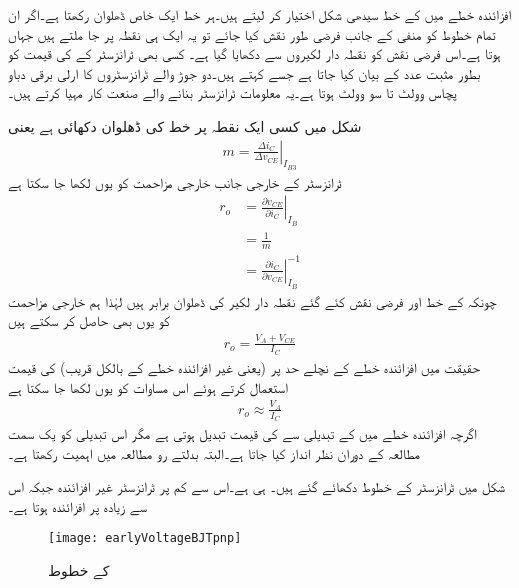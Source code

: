 افزائندہ خطے میں  کے خط سیدھی شکل اختیار کر لیتے ہیں۔ہر خط ایک خاص ڈھلوان رکھتا ہے۔اگر ان تمام خطوط کو منفی  کے جانب فرضی طور نقش کیا جائے تو یہ ایک ہی نقطہ پر جا ملتے ہیں جہاں  ہوتا ہے۔اس فرضی نقش کو نقطہ دار لکیروں سے دکھایا گیا ہے۔ کسی بھی ٹرانزسٹر کے  کی قیمت کو بطور مثبت عدد کے بیان کیا جاتا ہے جسے   کہتے ہیں۔دو جوڑ والے ٹرانزسٹروں کا ارلی برقی دباو پچاس وولٹ تا سو وولٹ ہوتا ہے۔یہ معلومات ٹرانزسٹر بنانے والے صنعت کار مہیا کرتے ہیں۔	

شکل   میں کسی ایک نقطہ پر خط کی ڈھلوان  دکھائی ہے یعنی
\begin{align*}
m=\left . \frac{\Delta i_C}{\Delta v_{CE}}\right |_{I_{B3}}
\end{align*}
ٹرانزسٹر کے خارجی جانب خارجی مزاحمت   کو یوں لکھا جا سکتا ہے
\begin{align*}
r_o &=\left . \frac{\partial v_{CE}}{\partial i_C}\right |_{I_B}\\
&=\frac{1}{m}\\
&= \left. \frac{\partial i_C}{\partial v_{CE}}\right |_{I_B}^{-1}
\end{align*}
چونکہ  کے خط اور فرضی نقش کئے گئے نقطہ دار لکیر کی ڈھلوان برابر ہیں لہٰذا ہم خارجی مزاحمت کو یوں بھی حاصل کر سکتے ہیں
\begin{align} \label{مساوات_ٹرانزسٹر_باریک_خارجی_مزاحمت_حتمی}
r_o = \frac{V_A+V_{CE}}{I_C}
\end{align}
حقیقت میں افزائندہ خطے کے نچلے حد پر (یعنی غیر افزائندہ خطے کے بالکل قریب) کی قیمت  استعمال کرتے ہوئے اس مساوات کو یوں لکھا جا سکتا ہے
\begin{align} \label{مساوات_ٹرانزسٹر_باریک_خارجی_مزاحمت}
r_o \approx \frac{V_A}{I_C}
\end{align}
اگرچہ افزائندہ خطے میں   کے تبدیلی سے  کی قیمت تبدیل ہوتی ہے مگر اس تبدیلی کو یک سمت مطالعہ کے دوران نظر انداز کیا جاتا ہے۔البتہ بدلتے رو مطالعہ میں  اہمیت رکھتا ہے۔

شکل  میں  ٹرانزسٹر کے  خطوط دکھائے گئے ہیں۔ ہی ہے۔اس سے کم  پر ٹرانزسٹر غیر افزائندہ جبکہ اس سے زیادہ پر افزائندہ  ہوتا ہے۔

\begin{figure}
\centering
\texttt{[image: earlyVoltageBJTpnp]}
\caption{ کے  خطوط}
\label{شکل_ارلی_برقی_دباو_جمع_منفی_جمع_ٹرانزسٹر}
\end{figure}


